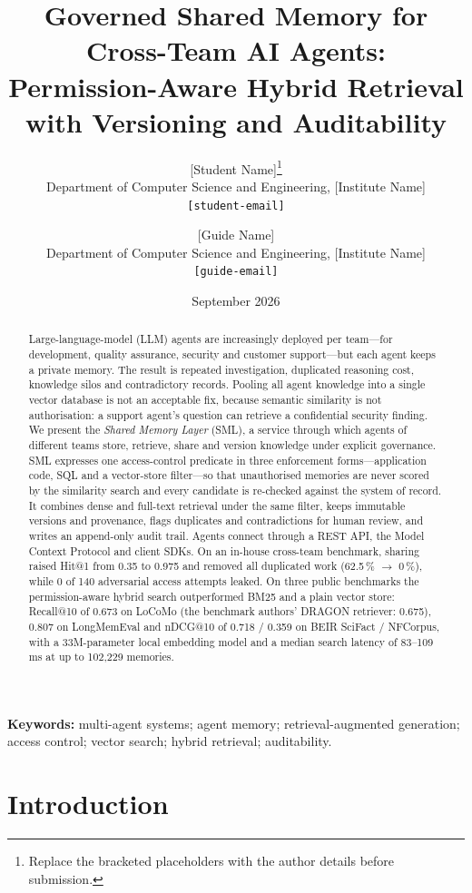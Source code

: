 \documentclass[11pt,a4paper]{article}
\title{\textbf{Governed Shared Memory for Cross-Team AI Agents:\\
Permission-Aware Hybrid Retrieval with Versioning and Auditability}}
\author{
  {[Student Name]}\thanks{Replace the bracketed placeholders with the author details before submission.}\\
  \small Department of Computer Science and Engineering, {[Institute Name]}\\
  \small \texttt{{[student-email]}}
  \and
  {[Guide Name]}\\
  \small Department of Computer Science and Engineering, {[Institute Name]}\\
  \small \texttt{{[guide-email]}}
}
\date{September 2026}
\newcommand{\sys}{SML}
\begin{document}
\maketitle

\begin{abstract}
Large-language-model (LLM) agents are increasingly deployed per team---for development, quality assurance,
security and customer support---but each agent keeps a private memory. The result is repeated
investigation, duplicated reasoning cost, knowledge silos and contradictory records. Pooling all agent
knowledge into a single vector database is not an acceptable fix, because semantic similarity is not
authorisation: a support agent's question can retrieve a confidential security finding. We present the
\emph{Shared Memory Layer} (\sys{}), a service through which agents of different teams store, retrieve,
share and version knowledge under explicit governance. \sys{} expresses one access-control predicate in
three enforcement forms---application code, SQL and a vector-store filter---so that unauthorised memories are
never scored by the similarity search and every candidate is re-checked against the system of record. It
combines dense and full-text retrieval under the same filter, keeps immutable versions and provenance,
flags duplicates and contradictions for human review, and writes an append-only audit trail. Agents
connect through a REST API, the Model Context Protocol and client SDKs. On an in-house cross-team benchmark,
sharing raised Hit@1 from 0.35 to 0.975 and removed all duplicated work (62.5\,\% $\rightarrow$ 0\,\%), while 0 of
140 adversarial access attempts leaked. On three public benchmarks the permission-aware hybrid search
outperformed BM25 and a plain vector store: Recall@10 of 0.673 on LoCoMo (the benchmark authors' DRAGON
retriever: 0.675), 0.807 on LongMemEval and nDCG@10 of 0.718 / 0.359 on BEIR SciFact / NFCorpus, with a
33M-parameter local embedding model and a median search latency of 83--109\,ms at up to 102{,}229 memories.
\end{abstract}

\noindent\textbf{Keywords:} multi-agent systems; agent memory; retrieval-augmented generation; access
control; vector search; hybrid retrieval; auditability.

\section{Introduction}
\end{document}
